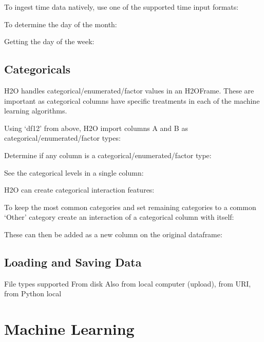 To ingest time data natively, use one of the supported time input formats:


To determine the day of the month:


Getting the day of the week:


\subsection{Categoricals}
H2O handles categorical/enumerated/factor values in an H2OFrame.  These are important as categorical
columns have specific treatments in each of the machine learning algorithms.

Using `df12' from above, H2O import columns A and B as categorical/enumerated/factor types:


Determine if any column is a categorical/enumerated/factor type:


See the categorical levels in a single column:


H2O can create categorical interaction features:


To keep the most common categories and set remaining categories to a common `Other' category
create an interaction of a categorical column with itself:


These can then be added as a new column on the original dataframe:


\subsection{Loading and Saving Data}
File types supported
From disk
Also from local computer (upload), from URI, from Python local


\section{Machine Learning}

